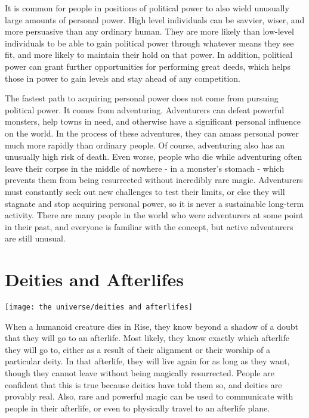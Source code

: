     It is common for people in positions of political power to also wield unusually large amounts of personal power.
    High level individuals can be savvier, wiser, and more persuasive than any ordinary human.
    They are more likely than low-level individuals to be able to gain political power through whatever means they see fit, and more likely to maintain their hold on that power.
    In addition, political power can grant further opportunities for performing great deeds, which helps those in power to gain levels and stay ahead of any competition.

    The fastest path to acquiring personal power does not come from pursuing political power.
    It comes from adventuring.
    Adventurers can defeat powerful monsters, help towns in need, and otherwise have a significant personal influence on the world.
    In the process of these adventures, they can amass personal power much more rapidly than ordinary people.
    Of course, adventuring also has an unusually high risk of death.
    Even worse, people who die while adventuring often leave their corpse in the middle of nowhere - in a monster's stomach - which prevents them from being resurrected without incredibly rare magic.
    Adventurers must constantly seek out new challenges to test their limits, or else they will stagnate and stop acquiring personal power, so it is never a sustainable long-term activity.
    There are many people in the world who were adventurers at some point in their past, and everyone is familiar with the concept, but active adventurers are still unusual.

\section{Deities and Afterlifes}\label{Deities and Afterlifes}
    \texttt{[image: the universe/deities and afterlifes]}

    When a humanoid creature dies in Rise, they know beyond a shadow of a doubt that they will go to an afterlife.
    Most likely, they know exactly which afterlife they will go to, either as a result of their alignment or their worship of a particular deity.
    In that afterlife, they will live again for as long as they want, though they cannot leave without being magically resurrected.
    People are confident that this is true because deities have told them so, and deities are provably real.
    Also, rare and powerful magic can be used to communicate with people in their afterlife, or even to physically travel to an afterlife plane.

